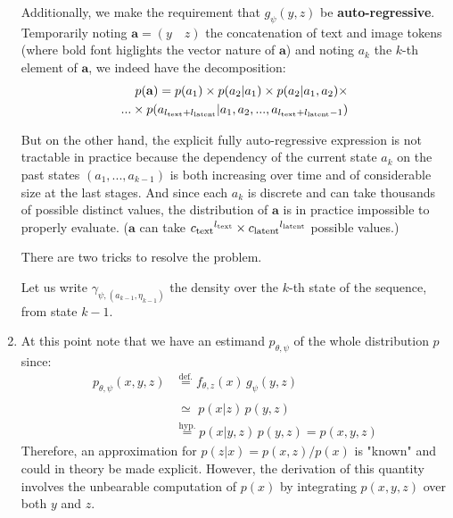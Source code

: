 \documentclass{article}
\begin{document}
\begin{multicols}{2}
\begin{enumerate}
    Additionally, we make the requirement that $g_\psi(y,z)$ be \textbf{auto-regressive}. Temporarily noting $\mathbf{a}=(y \quad z)$ the concatenation of text and image tokens (where bold font higlights the vector nature of $\mathbf{a}$) and noting $a_k$ the $k$-th element of $\mathbf{a}$, we indeed have the decomposition: \begin{equation*} \begin{split}
    p(\mathbf{a}) = p(a_1) \times p(a_2|a_1) \times p(a_2|a_1,a_2) \times \\ ... \times p(a_{{l_{\mathrm{text}}}+{l_{\mathrm{latent}}}}|a_1,a_2,...,a_{{l_{\mathrm{text}}}+{l_{\mathrm{latent}}}-1})\end{split} \end{equation*}
    
    But on the other hand, the explicit fully auto-regressive expression is not tractable in practice because the dependency of the current state $a_k$ on the past states $(a_1,..., a_{k-1})$ is both increasing over time and of considerable size at the last stages. And since each $a_k$ is discrete and can take thousands of possible distinct values, the distribution of $\mathbf{a}$ is in practice impossible to properly evaluate. ($\mathbf{a}$ can take ${c_{\mathrm{text}}}^{l_{\mathrm{text}}}\times{c_{\mathrm{latent}}}^{l_{\mathrm{latent}}}$ possible values.)
    
    There are two tricks to resolve the problem. 
    Let us write $\gamma_{\psi,(a_{k-1},\eta_{k-1})}$ the density over the $k$-th state of the sequence, from state $k-1$.
    
    \item At this point note that we have an estimand $p_{\theta,\psi}$ of the whole distribution $p$ since: \begin{align*}
        p_{\theta,\psi}(x,y,z) & \overset{\text{def.}}{=} f_{\theta,z}(x) \, g_{\psi}(y,z) \\
        & \overset{\phantom{\text{def.}}}{\simeq} \, p(x|z) \, p(y,z) \\
        & \overset{\text{hyp.}}{=} p(x|y,z) \, p(y,z)=p(x,y,z)
    \end{align*}
    Therefore, an approximation for $p(z|x)=p(x,z)/p(x)$ is "known" and could in theory be made explicit. However, the derivation of this quantity involves the unbearable computation of $p(x)$ by integrating $p(x,y,z)$ over both $y$ and $z$.
    

\end{enumerate}
\end{multicols}
\end{document}
